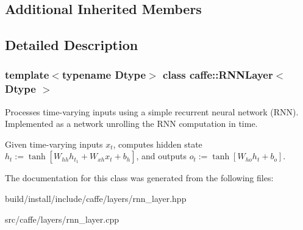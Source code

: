 \subsection*{Additional Inherited Members}


\subsection{Detailed Description}
\subsubsection*{template$<$typename Dtype$>$\newline
class caffe\+::\+R\+N\+N\+Layer$<$ Dtype $>$}

Processes time-\/varying inputs using a simple recurrent neural network (R\+NN). Implemented as a network unrolling the R\+NN computation in time. 

Given time-\/varying inputs $ x_t $, computes hidden state $ h_t := \tanh[ W_{hh} h_{t_1} + W_{xh} x_t + b_h ] $, and outputs $ o_t := \tanh[ W_{ho} h_t + b_o ] $. 

The documentation for this class was generated from the following files\+:\begin{DoxyCompactItemize}
\item 
build/install/include/caffe/layers/rnn\+\_\+layer.\+hpp\item 
src/caffe/layers/rnn\+\_\+layer.\+cpp\end{DoxyCompactItemize}
